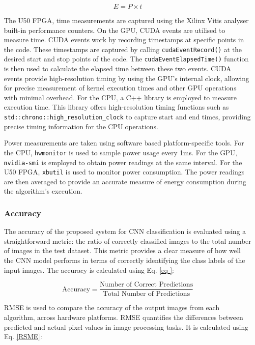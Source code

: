 \documentclass[]{spie}  %
\begin{document}
\begin{equation}\label{eq:Energy}
E = P \times t
\end{equation}

The U50 FPGA, time measurements are captured using the Xilinx Vitis analyser built-in performance counters. On the GPU, CUDA events are utilised to measure time. CUDA events work by recording timestamps at specific points in the code. These timestamps are captured by calling \verb|cudaEventRecord()| at the desired start and stop points of the code. The \verb|cudaEventElapsedTime()| function is then used to calculate the elapsed time between these two events. CUDA events provide high-resolution timing by using the GPU's internal clock, allowing for precise measurement of kernel execution times and other GPU operations with minimal overhead. For the CPU, a C++ library is employed to measure execution time. This library offers high-resolution timing functions such as \verb|std::chrono::high_resolution_clock| to capture start and end times, providing precise timing information for the CPU operations.

Power measurements are taken using software based platform-specific tools. For the CPU, \texttt{hwmonitor} is used to sample power usage every 1ms. For the GPU, \texttt{nvidia-smi} is employed to obtain power readings at the same interval. For the U50 FPGA, \texttt{xbutil} is used to monitor power consumption. The power readings are then averaged to provide an accurate measure of energy consumption during the algorithm's execution.

\subsubsection{Accuracy}
The accuracy of the proposed system for CNN classification is evaluated using a straightforward metric: the ratio of correctly classified images to the total number of images in the test dataset. This metric provides a clear measure of how well the CNN model performs in terms of correctly identifying the class labels of the input images. The accuracy is calculated using Eq. \ref{eq
}:

\begin{equation}\label{eq
}
\text{Accuracy} = \frac{\text{Number of Correct Predictions}}{\text{Total Number of Predictions}}
\end{equation}

RMSE is used to compare the accuracy of the output images from each algorithm, across hardware platforms. RMSE quantifies the differences between predicted and actual pixel values in image processing tasks. It is calculated using Eq. \ref{RSME}:
\end{document}
